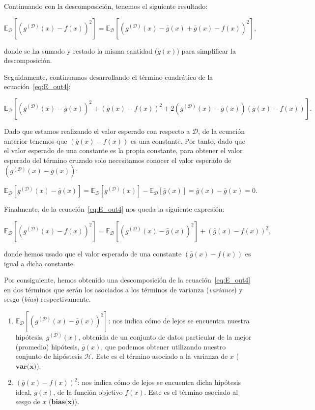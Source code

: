 Continuando con la descomposición, tenemos el siguiente resultado:

\begin{equation}\label{eq:E_out4}
    \mathbb{E}_{\mathcal{D}}[{(g^{\mathcal{(D)}}(x) - f(x))}^2] = \mathbb{E}_{\mathcal{D}}[{(g^{\mathcal{(D)}}(x) - \bar{g}(x) + \bar{g}(x) - f(x))}^2],
\end{equation}

donde se ha sumado y restado la misma cantidad ($\bar{g}(x)$) para simplificar la descomposición.

Seguidamente, continuamos desarrollando el término cuadrático de la ecuación~\eqref{eq:E_out4}:

\[ \mathbb{E}_{\mathcal{D}}[{(g^{\mathcal{(D)}}(x) - \bar{g}(x))}^2 + {(\bar{g}(x) - f(x))}^2 + 2(g^{\mathcal{(D)}}(x) - \bar{g}(x))(\bar{g}(x) - f(x))]. \]

Dado que estamos realizando el valor esperado con respecto a $\mathcal{D}$, de la ecuación anterior tenemos que $(\bar{g}(x) - f(x))$ es una constante. Por tanto, dado que el valor esperado de una constante es la propia constante, para obtener el valor esperado del término cruzado solo necesitamos conocer el valor esperado de $(g^{\mathcal{(D)}}(x) - \bar{g}(x))$:

\begin{equation}\label{eq:E_out6}
    \mathbb{E}_{\mathcal{D}}[g^{\mathcal{(D)}}(x) - \bar{g}(x)] = \mathbb{E}_{\mathcal{D}}[g^{\mathcal{(D)}}(x)] - \mathbb{E}_{\mathcal{D}}[\bar{g}(x)] = \bar{g}(x) - \bar{g}(x) = 0.
\end{equation}

Finalmente, de la ecuación~\eqref{eq:E_out4} nos queda la siguiente expresión:

\begin{equation}\label{eq:E_out7}
    \mathbb{E}_{\mathcal{D}}[{(g^{\mathcal{(D)}}(x) - f(x))}^2] = \mathbb{E}_{\mathcal{D}}[{(g^{\mathcal{(D)}}(x) - \bar{g}(x))}^2] + {(\bar{g}(x) - f(x))}^2,
\end{equation}

donde hemos usado que el valor esperado de una constante $(\bar{g}(x) - f(x))$ es igual a dicha constante.

Por consiguiente, hemos obtenido una descomposición de la ecuación~\eqref{eq:E_out4} en dos términos que serán los asociados a los términos de varianza (\textit{variance}) y sesgo (\textit{bias}) respectivamente.

\begin{enumerate}
    \item $\mathbb{E}_{\mathcal{D}}[{(g^{\mathcal{(D)}}(x) - \bar{g}(x))}^2]$: nos indica cómo de lejos se encuentra nuestra hipótesis, $g^{\mathcal{(D)}}(x)$, obtenida de un conjunto de datos particular de la mejor (promedio) hipótesis, $\bar{g}(x)$, que podemos obtener utilizando nuestro conjunto de hipóstesis $\mathcal{H}$. Este es el término asociado a la varianza de $x$ ($\textbf{var(x)}$).
    \item ${(\bar{g}(x) - f(x))}^2$: nos indica cómo de lejos se encuentra dicha hipótesis ideal, $\bar{g}(x)$, de la función objetivo $f(x)$. Este es el término asociado al sesgo de $x$ ($\textbf{bias(x)}$).
\end{enumerate}

